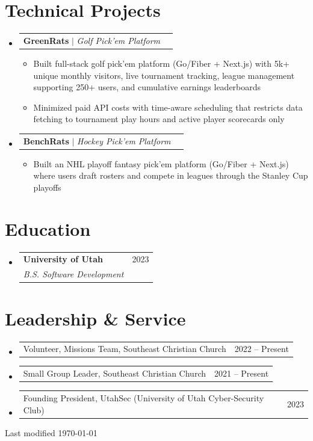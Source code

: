 \documentclass[letterpaper,11pt]{article}
\makeatletter
\newcommand{\resumeItem}[1]{
  \item\small{
    {#1 \vspace{-2pt}}
  }
}
\newcommand{\resumeSubheading}[4]{
  \vspace{-2pt}\item
    \begin{tabular*}{0.97\textwidth}[t]{l@{\extracolsep{\fill}}r}
      \textbf{#1} & #2 \\
      \textit{\small#3} & \textit{\small #4} \\
    \end{tabular*}\vspace{-7pt}
}
\newcommand{\resumeProjectHeading}[2]{
    \item
    \begin{tabular*}{0.97\textwidth}{l@{\extracolsep{\fill}}r}
      \small#1 & #2 \\
    \end{tabular*}\vspace{-7pt}
}
\newcommand{\resumeSubHeadingListStart}{\begin{itemize}[leftmargin=0.15in, label={}]}
\newcommand{\resumeSubHeadingListEnd}{\end{itemize}}
\newcommand{\resumeItemListStart}{\begin{itemize}}
\newcommand{\resumeItemListEnd}{\end{itemize}\vspace{-5pt}}
\makeatother
\begin{document}
\section{Technical Projects}
    \resumeSubHeadingListStart
      \resumeProjectHeading
          {\textbf{GreenRats} $|$ \emph{Golf Pick’em Platform}}{}
          \resumeItemListStart
            \resumeItem{Built full-stack golf pick’em platform (Go/Fiber + Next.js) with 5k+ unique monthly visitors, live tournament tracking, league management supporting 250+ users, and cumulative earnings leaderboards}
            \resumeItem{Minimized paid API costs with time-aware scheduling that restricts data fetching to tournament play hours and active player scorecards only}
          \resumeItemListEnd
      \resumeProjectHeading
          {\textbf{BenchRats} $|$ \emph{Hockey Pick'em Platform}}{}
          \resumeItemListStart
            \resumeItem{Built an NHL playoff fantasy pick'em platform (Go/Fiber + Next.js) where users draft rosters and compete in leagues through the Stanley Cup playoffs}
          \resumeItemListEnd
    \resumeSubHeadingListEnd


\section{Education}
  \resumeSubHeadingListStart
    \resumeSubheading
      {University of Utah}{2023}
      {B.S. Software Development}{}
  \resumeSubHeadingListEnd


\section{Leadership \& Service}
  \resumeSubHeadingListStart
    \resumeProjectHeading
        {Volunteer, Missions Team, Southeast Christian Church}{2022 -- Present}
    \resumeProjectHeading
        {Small Group Leader, Southeast Christian Church}{2021 -- Present}
    \resumeProjectHeading
        {Founding President, UtahSec (University of Utah Cyber-Security Club)}{2023}
  \resumeSubHeadingListEnd


\vfill
\begin{center}
    {\footnotesize\color{gray!50} Last modified \today}
\end{center}
\end{document}

